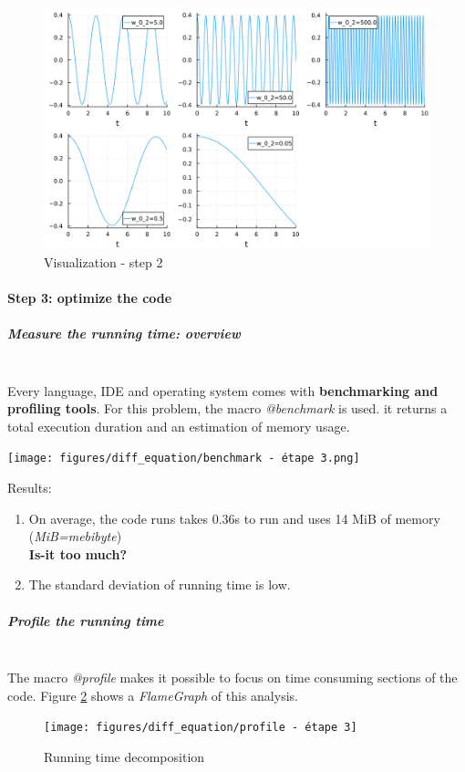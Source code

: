 \documentclass[11pt]{article}
\begin{document}
					\begin{figure}[h!]
							\centering
							\includegraphics[width=14cm]{figures/diff_equation/first_parameters_set.png}
							\caption{Visualization - step 2}
							\label{fig:step2_plot}
					\end{figure}

				\newpage
				\paragraph{Step 3: optimize the code}

					\subparagraph{Measure the running time: overview} \mbox{} \\
						Every language, IDE and operating system comes with \textbf{benchmarking and profiling tools}.
						For this problem, the macro \textit{@benchmark} is used. it returns a total execution duration and an estimation of memory usage.
						\begin{center}
									\texttt{[image: figures/diff\_equation/benchmark - étape 3.png]}
						\end{center}
						Results:
						\begin{enumerate}
									\item On average, the code runs takes 0.36s to run and uses 14 MiB of memory (\textit{MiB=mebibyte}) \\
									\textrightarrow \quad \textbf{Is-it too much?}
									\item The standard deviation of running time is low.
						\end{enumerate}

					\subparagraph{Profile the running time} \mbox{} \\
						The macro \textit{@profile} makes it possible to focus on time consuming sections of the code.
						Figure \ref{fig:profile} shows a \textit{FlameGraph} of this analysis.
						\begin{figure}
									\centering
									\texttt{[image: figures/diff\_equation/profile - étape 3]}
									\caption{Running time decomposition}
									\label{fig:profile}
						\end{figure}
\end{document}
